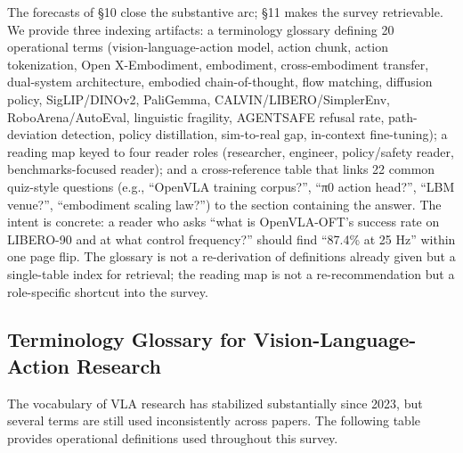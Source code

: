 \documentclass{article}
\begin{document}
The forecasts of §10 close the substantive arc; §11 makes the survey retrievable. We provide three indexing artifacts: a terminology glossary defining 20 operational terms (vision-language-action model, action chunk, action tokenization, Open X-Embodiment, embodiment, cross-embodiment transfer, dual-system architecture, embodied chain-of-thought, flow matching, diffusion policy, SigLIP/DINOv2, PaliGemma, CALVIN/LIBERO/SimplerEnv, RoboArena/AutoEval, linguistic fragility, AGENTSAFE refusal rate, path-deviation detection, policy distillation, sim-to-real gap, in-context fine-tuning); a reading map keyed to four reader roles (researcher, engineer, policy/safety reader, benchmarks-focused reader); and a cross-reference table that links 22 common quiz-style questions (e.g., ``OpenVLA training corpus?'', ``π0 action head?'', ``LBM venue?'', ``embodiment scaling law?'') to the section containing the answer. The intent is concrete: a reader who asks ``what is OpenVLA-OFT's success rate on LIBERO-90 and at what control frequency?'' should find ``87.4\% at 25 Hz'' within one page flip. The glossary is not a re-derivation of definitions already given but a single-table index for retrieval; the reading map is not a re-recommendation but a role-specific shortcut into the survey.

\subsection{Terminology Glossary for Vision-Language-Action Research}\label{terminology-glossary-for-vision-language-action-research}

The vocabulary of VLA research has stabilized substantially since 2023, but several terms are still used inconsistently across papers. The following table provides operational definitions used throughout this survey.
\end{document}
